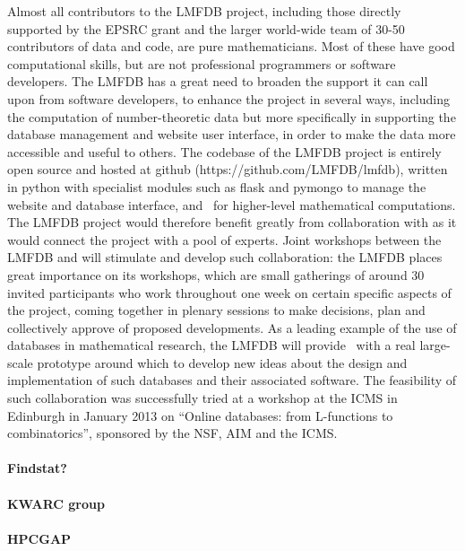 Almost all contributors to the LMFDB project, including those directly
supported by the EPSRC grant and the larger world-wide team of 30-50
contributors of data and code, are pure mathematicians.  Most of these
have good computational skills, but are not professional programmers
or software developers.  The LMFDB has a great need to broaden the
support it can call upon from software developers, to enhance the
project in several ways, including the computation of number-theoretic
data but more specifically in supporting the database management and
website user interface, in order to make the data more accessible and
useful to others.  The codebase of the LMFDB project is entirely open
source and hosted at github (https://github.com/LMFDB/lmfdb), written
in python with specialist modules such as flask and pymongo to manage
the website and database interface, and \Sage\ for higher-level
mathematical computations.  The LMFDB project would therefore benefit
greatly from collaboration with \TheProject as it would connect the
project with a pool of experts.  Joint workshops between the LMFDB and
\TheProject will stimulate and develop such collaboration: the LMFDB
places great importance on its workshops, which are small gatherings
of around 30 invited participants who work throughout one week on
certain specific aspects of the project, coming together in plenary
sessions to make decisions, plan and collectively approve of proposed
developments.  As a leading example of the use of databases in
mathematical research, the LMFDB will provide \TheProject\ with a real
large-scale prototype around which to develop new ideas about the
design and implementation of such databases and their associated
software.  The feasibility of such collaboration was successfully
tried at a workshop at the ICMS in Edinburgh in January 2013 on
``Online databases: from L-functions to combinatorics'', sponsored by
the NSF, AIM and the ICMS.

\paragraph{Findstat?}

\paragraph{KWARC group}


\paragraph{HPCGAP}
